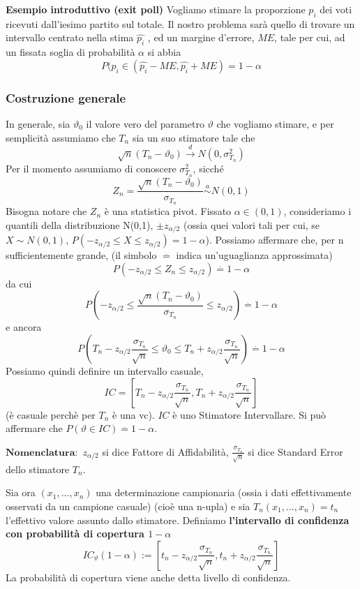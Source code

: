 \textbf{Esempio introduttivo (exit poll)}
Vogliamo stimare la proporzione $p_i$ dei voti ricevuti dall'iesimo partito sul totale. Il nostro problema sarà quello di trovare un intervallo centrato nella stima $\hat{p_i}$ , ed un margine d'errore, $ME$, tale per cui, ad un fissata soglia di probabilità $\alpha$ si abbia $$P(p_i \in (\hat{p_i} - ME,\hat{p_i} + ME)=1 - \alpha$$
\subsubsection{Costruzione generale}
In generale, sia $\vartheta_0$ il valore vero del parametro $\vartheta$ che vogliamo stimare, e per semplicità assumiamo che $T_n$ sia un suo stimatore tale che 
$$\sqrt{n}(T_n - \vartheta_0)\stackrel{d}{\rightarrow}N(0,\sigma_{T_n}^2)$$
Per il momento assumiamo di conoscere $\sigma_{T_n}^2$, sicché
$$Z_n=\frac{\sqrt{n}(T_n - \vartheta_0)}{\sigma_{T_n}} \stackrel{a}{\sim}N(0,1)$$ Bisogna notare che $Z_n$ è una statistica pivot.
Fissato $\alpha \in (0,1)$, consideriamo i quantili della distribuzione N(0,1), $\pm z_{\alpha / 2}$ (ossia quei valori tali per cui, se $X \sim N(0,1)$, $P(-z_{\alpha / 2} \leq X \leq z_{\alpha / 2})=1-\alpha$). Possiamo affermare che, per n sufficientemente grande, (il simbolo $\stackrel{.}{=}$ indica un'uguaglianza approssimata) $$P(-z_{\alpha / 2} \leq Z_n \leq z_{\alpha / 2})\stackrel{.}{=}1-\alpha$$ da cui
$$P(-z_{\alpha / 2} \leq \frac{\sqrt{n}(T_n - \vartheta_0)}{\sigma_{T_n}} \leq z_{\alpha / 2})\stackrel{.}{=}1-\alpha $$ e ancora
$$P(T_n - z_{\alpha / 2} \frac{\sigma_{T_n}}{\sqrt{n}} \leq \vartheta_0 \leq T_n+z_{\alpha / 2} \frac{\sigma_{T_n}}{\sqrt{n}})\stackrel{.}{=}1-\alpha$$
Possiamo quindi definire un intervallo casuale, $$IC=\left[T_n - z_{\alpha / 2} \frac{\sigma_{T_n}}{\sqrt{n}},T_n + z_{\alpha / 2} \frac{\sigma_{T_n}}{\sqrt{n}}\right]$$ (è casuale perchè per $T_n$ è una vc). $IC$ è uno Stimatore Intervallare.
Si può affermare che $P(\vartheta \in IC) \stackrel {.}{=} 1 - \alpha$.

$\textbf{Nomenclatura}:$
$z_{\alpha / 2}$ si dice Fattore di Affidabilità,
$\frac{\sigma_{T_n}}{\sqrt{n}}$ si dice Standard Error dello stimatore $T_n$.

Sia ora $(x_1,...,x_n)$ una determinazione campionaria (ossia i dati effettivamente osservati da un campione casuale) (cioè una n-upla) e sia $T_n(x_1,...,x_n)=t_n$ l'effettivo valore assunto dallo stimatore.
Definiamo \textbf{l'intervallo di confidenza con probabilità di copertura $1-\alpha$} $$IC_\vartheta (1-\alpha) := \left[t_n - z_{\alpha / 2} \frac{\sigma_{T_n}}{\sqrt{n}}, t_n + z_{\alpha / 2} \frac{\sigma_{T_n}}{\sqrt{n}}\right]$$
La probabilità di copertura viene anche detta livello di confidenza.

